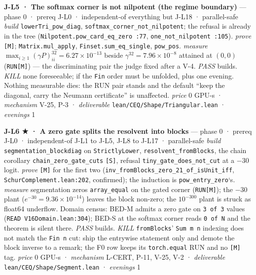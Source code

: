 \documentclass[11pt,a4paper]{article}
\newcounter{none}                 %
\theoremstyle{plain}
\theoremstyle{definition}
\theoremstyle{remark}
\begin{document}
\textbf{J-L5 · The softmax corner is not nilpotent (the regime
boundary)} --- phase 0 · prereq J-L0 · independent-of everything but
J-L18 · parallel-safe \emph{build} \texttt{lowerTri\_pow\_diag},
\texttt{softmax\_corner\_not\_nilpotent}; the refusal is already in the
tree (\texttt{Nilpotent.pow\_card\_eq\_zero\ :77},
\texttt{one\_not\_nilpotent\ :105}). \emph{prove} \texttt{{[}M{]}};
\texttt{Matrix.mul\_apply}, \texttt{Finset.sum\_eq\_single},
\texttt{pow\_pos}. \emph{measure}
\(\max_{i\ge1}(\gamma P)^{32}_{ii}=6.27\times10^{-13}\) beside
\(\gamma^{32}=7.96\times10^{-8}\) attained at \((0,0)\)
(\texttt{RUN{[}M{]}}) --- the discriminating pair the judge fixed after
a V-4. \emph{PASS} builds. \emph{KILL} none foreseeable; if the
\texttt{Fin} order must be unfolded, plus one evening. Nothing
measurable dies: the RUN pair stands and the default ``keep the
diagonal, carry the Neumann certificate'' is unaffected. \emph{price}
\(0\) GPU-s · \emph{mechanism} V-25, P-3 · \emph{deliverable}
\texttt{lean/CEQ/Shape/Triangular.lean} · \emph{evenings} 1

\textbf{J-L6 ★ · A zero gate splits the resolvent into blocks} --- phase
0 · prereq J-L0 · independent-of J-L1 to J-L5, J-L8 to J-L17 ·
parallel-safe \emph{build} \texttt{segmentation\_blockdiag} on
\texttt{StrictlyLower}, \texttt{resolvent\_fromBlocks}, the chain
corollary \texttt{chain\_zero\_gate\_cuts} \texttt{{[}S{]}}, refusal
\texttt{tiny\_gate\_does\_not\_cut} at a \(-30\) logit. \emph{prove}
\texttt{{[}M{]}} for the first two
(\texttt{inv\_fromBlocks\_zero\_21\_of\_isUnit\_iff},
\texttt{SchurComplement.lean:202}, confirmed); the induction is
\texttt{pow\_entry\_zero}`s. \emph{measure} segmentation zeros
\texttt{array\_equal} on the gated corner (\texttt{RUN{[}M{]}}); the
\(-30\) plant (\(e^{-30}=9.36\times10^{-14}\)) leaves the block
non-zero; the \(10^{-300}\) plant is struck as float64 underflow. Domain
census: BED-M admits a zero gate on \texttt{3\ of\ 3} values
(\texttt{READ\ V16Domain.lean:304}); BED-S at the softmax corner reads
\texttt{0\ of\ N} and the theorem is silent there. \emph{PASS} builds.
\emph{KILL} \texttt{fromBlocks}' \texttt{Sum\ m\ n\textquotesingle{}}
indexing does not match the \texttt{Fin\ n} cut: ship the entrywise
statement only and demote the block inverse to a remark; the F0 row
keeps its \texttt{torch.equal} RUN and no \texttt{{[}M{]}} tag.
\emph{price} \(0\) GPU-s · \emph{mechanism} L-CERT, P-11, V-25, V-2 ·
\emph{deliverable} \texttt{lean/CEQ/Shape/Segment.lean} ·
\emph{evenings} 1
\end{document}
